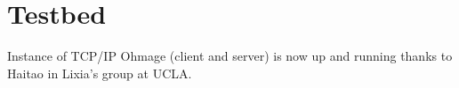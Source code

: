 \section{Testbed}

Instance of TCP/IP Ohmage (client and server) is now up and running thanks to Haitao in Lixia’s group at UCLA.  
